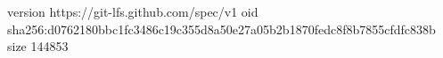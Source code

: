 version https://git-lfs.github.com/spec/v1
oid sha256:d0762180bbc1fc3486c19c355d8a50e27a05b2b1870fedc8f8b7855cfdfc838b
size 144853
